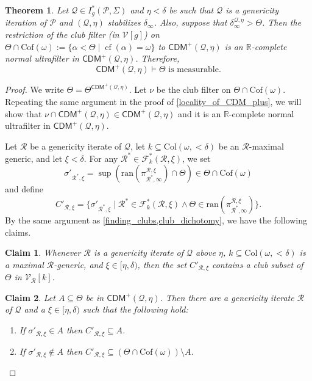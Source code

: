 \documentclass{amsart}
\newtheorem{thm}[dfn]{Theorem}
\newtheorem{claim}{Claim}[dfn]
\renewcommand{\subset}{\subseteq}
\DeclareMathOperator{\cf}{cf}
\begin{document}
\begin{thm}\label{Theta_measurable}
    Let $\mathcal{Q}\in I^*_g(\mathcal{P}, \Sigma)$ and $\eta<\delta$ be such that $\mathcal{Q}$ is a genericity iteration of $\mathcal{P}$ and $(\mathcal{Q}, \eta)$ stabilizes $\delta_{\infty}$.
    Also, suppose that $\delta^{\mathcal{Q}, \eta}_{\infty}>\Theta$.
    Then the restriction of the club filter (in $\mathcal{V}[g]$) on $\Theta\cap\mathrm{Cof}(\omega):=\{\alpha<\Theta\mid\cf(\alpha)=\omega\}$ to $\mathsf{CDM}^+(\mathcal{Q}, \eta)$ is an $\mathbb{R}$-complete normal ultrafilter in $\mathsf{CDM}^+(\mathcal{Q}, \eta)$.
    Therefore,
    \[
    \mathsf{CDM}^+(\mathcal{Q}, \eta)\models\Theta\text{ is measurable.}
    \]
\end{thm}
\begin{proof}
    We write $\Theta=\Theta^{\mathsf{CDM}^+(\mathcal{Q}, \eta)}$.
    Let $\nu$ be the club filter on $\Theta\cap\mathrm{Cof}(\omega)$.
    Repeating the same argument in the proof of \cref{locality_of_CDM_plus}, we will show that $\nu\cap\mathsf{CDM}^+(\mathcal{Q}, \eta)\in\mathsf{CDM}^+(\mathcal{Q}, \eta)$ and it is an $\mathbb{R}$-complete normal ultrafilter in $\mathsf{CDM}^+(\mathcal{Q}, \eta)$.
    
    Let $\mathcal{R}$ be a genericity iterate of $\mathcal{Q}$, let $k\subset\mathrm{Col}(\omega, {<}\delta)$ be an $\mathcal{R}$-maximal generic, and let $\xi<\delta$.
    For any $\mathcal{R}^*\in\mathcal{F}^*_k(\mathcal{R}, \xi)$, we set
    \[
    \sigma'_{\mathcal{R}^*, \xi}=\sup(\mathrm{ran}(\pi^{\mathcal{R}, \xi}_{\mathcal{R}^*, \infty})\cap\Theta)\in\Theta\cap\mathrm{Cof}(\omega)
    \]
    and define
    \[
    C'_{\mathcal{R}, \xi}=\{\sigma'_{\mathcal{R}^*, \xi}\mid\mathcal{R}^*\in\mathcal{F}^*_k(\mathcal{R}, \xi)\land\Theta\in\mathrm{ran}(\pi^{\mathcal{R}, \xi}_{\mathcal{R}^*, \infty})\}.
    \]
    By the same argument as \cref{finding_clubs,club_dichotomy}, we have the following claims.
    
    \begin{claim}
        Whenever $\mathcal{R}$ is a genericity iterate of $\mathcal{Q}$ above $\eta$, $k\subset\mathrm{Col}(\omega, {<}\delta)$ is a maximal $\mathcal{R}$-generic, and $\xi\in[\eta, \delta)$, then the set $C'_{\mathcal{R}, \xi}$ contains a club subset of $\Theta$ in $\mathcal{V}_{\mathcal{R}}[k]$.
    \end{claim}
    
    \begin{claim}
        Let $A\subset\Theta$ be in $\mathsf{CDM}^+(\mathcal{Q}, \eta)$.
        Then there are a genericity iterate $\mathcal{R}$ of $\mathcal{Q}$ and a $\xi\in [\eta, \delta)$ such that the following hold:
        \begin{enumerate}
            \item If $\sigma'_{\mathcal{R}, \xi}\in A$ then $C'_{\mathcal{R}, \xi}\subset A$.
            \item If $\sigma'_{\mathcal{R}, \xi}\notin A$ then $C'_{\mathcal{R}, \xi}\subset (\Theta\cap\mathrm{Cof}(\omega))\setminus A$.
        \end{enumerate}
    \end{claim}


\end{proof}
\end{document}
